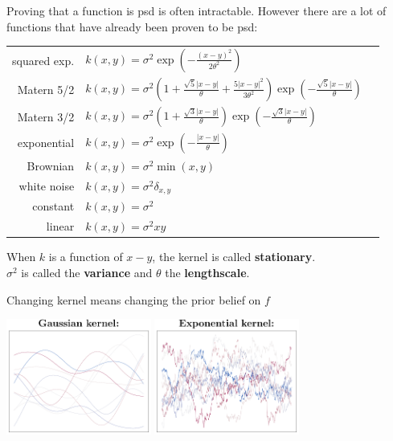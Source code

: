 \documentclass{beamer}
\begin{document}
\begin{frame}{}
Proving that a function is psd is often intractable. However there are a lot of functions that have already been proven to be psd:\\
\vspace{2mm}
\scriptsize
\begin{tabular}{rlN}
    squared exp. & $\displaystyle k(x,y) = \sigma^2 \exp \left(- \frac{(x-y)^2}{2 \theta^2} \right)$ &\\[4mm]
    Matern 5/2 & $\displaystyle k(x,y) = \sigma^2 \left(1 + \frac{\sqrt{5}|x-y|}{\theta} + \frac{5|x-y|^2}{3 \theta^2} \right) \exp \left(- \frac{\sqrt{5}|x-y|}{\theta} \right)$ &\\[4mm]
    Matern 3/2 & $\displaystyle k(x,y) = \sigma^2 \left(1 + \frac{\sqrt{3}|x-y|}{\theta} \right) \exp \left(- \frac{\sqrt{3}|x-y|}{\theta} \right)$ &\\[4mm]
    exponential & $\displaystyle k(x,y) = \sigma^2 \exp \left(- \frac{|x-y|}{\theta} \right)$ &\\[4mm]
    Brownian & $ \displaystyle k(x,y) = \sigma^2 \min (x,y) $ &\\[4mm]
    white noise & $ \displaystyle k(x,y) = \sigma^2 \delta_{x,y} $ &\\[4mm]
    constant & $ \displaystyle k(x,y) = \sigma^2 $ &\\[4mm]
    linear & $ \displaystyle k(x,y) = \sigma^2 xy $ &\\[4mm]
\end{tabular}
\vspace{2mm}
\normalsize
When $k$ is a function of $x-y$, the kernel is called \textbf{stationary}.\\
$\sigma^2$ is called the \textbf{variance} and $\theta$ the \textbf{lengthscale}.
\end{frame}

\begin{frame}{}
Changing kernel means changing the prior belief on $f$\\ 
\begin{center}
\includegraphics[height=3.8cm]{figures/R/Fig2-sim-rbf} \qquad 
\includegraphics[height=3.8cm]{figures/R/Fig2-sim-exp}
\end{center}
\end{frame}
\end{document}
